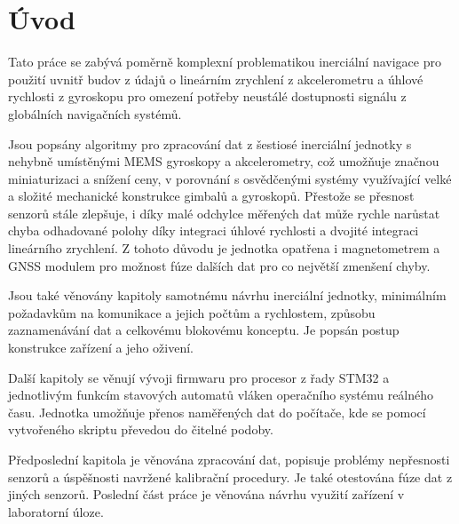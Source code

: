 \chapter*{Úvod}
{}

Tato práce se zabývá poměrně komplexní problematikou inerciální navigace pro použití uvnitř budov z údajů o lineárním zrychlení z akcelerometru a úhlové rychlosti z gyroskopu pro omezení potřeby neustálé dostupnosti signálu z globálních navigačních systémů.

Jsou popsány algoritmy pro zpracování dat z šestiosé inerciální jednotky s nehybně umístěnými \ac{MEMS} gyroskopy a akcelerometry, což umožňuje značnou miniaturizaci a snížení ceny, v porovnání s osvědčenými systémy využívající velké a složité mechanické konstrukce gimbalů a gyroskopů. Přestože se přesnost senzorů stále zlepšuje, i díky malé odchylce měřených dat může rychle narůstat chyba odhadované polohy díky integraci úhlové rychlosti a dvojité integraci lineárního zrychlení. Z tohoto důvodu je jednotka opatřena i magnetometrem a \ac{GNSS} modulem pro možnost fúze dalších dat pro co největší zmenšení chyby.

Jsou také věnovány kapitoly samotnému návrhu inerciální jednotky, minimálním požadavkům na komunikace a jejich počtům a rychlostem, způsobu zaznamenávání dat a celkovému blokovému konceptu. Je popsán postup konstrukce zařízení a jeho oživení.

Další kapitoly se věnují vývoji firmwaru pro procesor z řady STM32 a jednotlivým funkcím stavových automatů vláken operačního systému reálného času. Jednotka umožňuje přenos naměřených dat do počítače, kde se pomocí vytvořeného skriptu převedou do čitelné podoby.

Předposlední kapitola je věnována zpracování dat, popisuje problémy nepřesnosti senzorů a úspěšnosti navržené kalibrační procedury. Je také otestována fúze dat z jiných senzorů. Poslední část práce je věnována návrhu využití zařízení v laboratorní úloze.